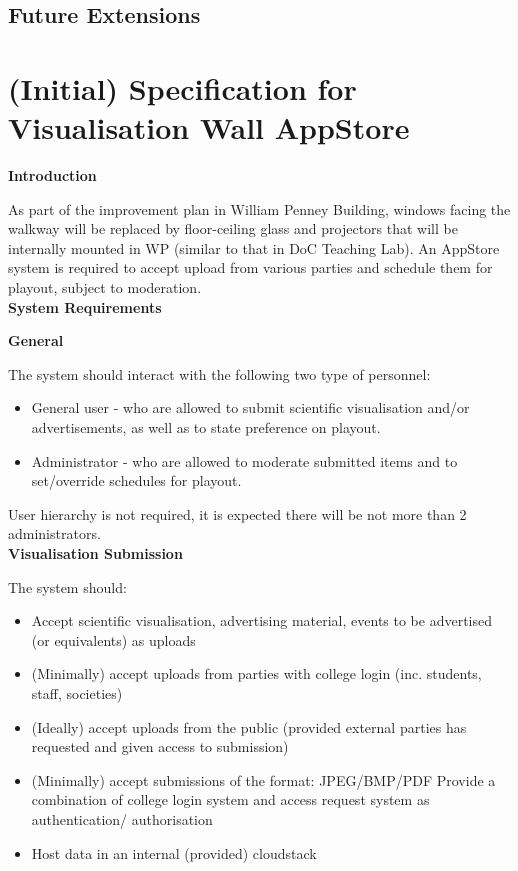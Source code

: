 ﻿\documentclass[a4paper, titlepage]{article}
\begin{document}
\subsection{Future Extensions}




\newpage
\appendix

\section{(Initial) Specification for Visualisation Wall AppStore}

\textbf{\Large Introduction}

As part of the improvement plan in William Penney Building, windows facing the walkway will be replaced by floor-ceiling glass and projectors that will be internally mounted in WP (similar to that in DoC Teaching Lab). An AppStore system is required to accept upload from various parties and schedule them for playout, subject to moderation.\\

\textbf{\Large System Requirements} \vspace{5pt}

\textbf{\large General}

The system should interact with the following two type of personnel:

\begin{itemize}
  \item General user - who are allowed to submit scientific visualisation and/or advertisements, as well as to state preference on playout.
  \item Administrator - who are allowed to moderate submitted items and to set/override schedules for playout.
\end{itemize}

User hierarchy is not required, it is expected there will be not more than 2 administrators.\\

\textbf{\large Visualisation Submission}

The system should:

\begin{itemize}
\item Accept scientific visualisation, advertising material, events to be advertised (or equivalents) as uploads
\item (Minimally) accept uploads from parties with college login (inc. students, staff, societies)
\item (Ideally) accept uploads from the public (provided external parties has requested and given access to submission)
\item (Minimally) accept submissions of the format: JPEG/BMP/PDF Provide a combination of college login system and access request system as authentication/ authorisation
\item Host data in an internal (provided) cloudstack\\
\end{itemize}
\end{document}
